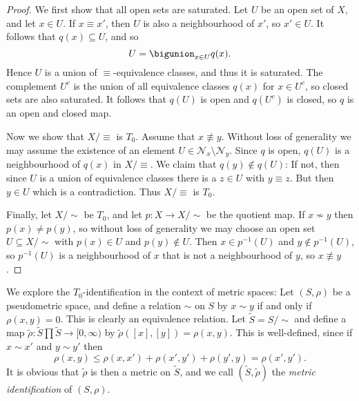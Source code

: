 \documentclass[article, a4paper, 11pt, oneside]{memoir}
\numberwithin{equation}{chapter}
\newcommand{\preim}{^{-1}}
\newcommand{\calN}{\mathcal{N}}
\newcommand{\nhoodfilter}[1]{\calN_{#1}}
\begin{document}
\begin{proof}
    We first show that all open sets are saturated. Let $U$ be an open set of $X$, and let $x \in U$. If $x \equiv x'$, then $U$ is also a neighbourhood of $x'$, so $x' \in U$. It follows that $q(x) \subseteq U$, and so
    \begin{equation*}
        U = \bigunion_{x \in U} q(x).
    \end{equation*}
    Hence $U$ is a union of $\equiv$-equivalence classes, and thus it is saturated. The complement $U^c$ is the union of all equivalence classes $q(x)$ for $x \in U^c$, so closed sets are also saturated. It follows that $q(U)$ is open and $q(U^c)$ is closed, so $q$ is an open and closed map.

    Now we show that $X/{\equiv}$ is $T_0$. Assume that $x \not\equiv y$. Without loss of generality we may assume the existence of an element $U \in \nhoodfilter{x} \setminus \nhoodfilter{y}$. Since $q$ is open, $q(U)$ is a neighbourhood of $q(x)$ in $X/{\equiv}$. We claim that $q(y) \not\in q(U)$: If not, then since $U$ is a union of equivalence classes there is a $z \in U$ with $y \equiv z$. But then $y \in U$ which is a contradiction. Thus $X/{\equiv}$ is $T_0$.

    Finally, let $X/{\sim}$ be $T_0$, and let $p \colon X \to X/{\sim}$ be the quotient map. If $x \not\sim y$ then $p(x) \neq p(y)$, so without loss of generality we may choose an open set $U \subseteq X/{\sim}$ with $p(x) \in U$ and $p(y) \not\in U$. Then $x \in p\preim(U)$ and $y \not\in p\preim(U)$, so $p\preim(U)$ is a neighbourhood of $x$ that is not a neighbourhood of $y$, so $x \not\equiv y$.
\end{proof}

We explore the $T_0$-identification in the context of metric spaces: Let $(S,\rho)$ be a pseudometric space, and define a relation $\sim$ on $S$ by $x \sim y$ if and only if $\rho(x,y) = 0$. This is clearly an equivalence relation. Let $\tilde{S} = S/{\sim}$ and define a map $\tilde{\rho} \colon \tilde{S} \prod \tilde{S} \to [0,\infty)$ by $\tilde{\rho}([x],[y]) = \rho(x,y)$. This is well-defined, since if $x \sim x'$ and $y \sim y'$ then
%
\begin{equation*}
    \rho(x,y)
        \leq \rho(x,x') + \rho(x',y') + \rho(y',y)
        = \rho(x',y').
\end{equation*}
%
It is obvious that $\tilde{\rho}$ is then a metric on $\tilde{S}$, and we call $(\tilde{S}, \tilde{\rho})$ the \emph{metric identification} of $(S,\rho)$.
\end{document}
